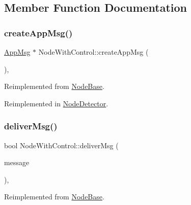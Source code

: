 \subsection{Member Function Documentation}
\mbox{\label{classNodeWithControl_a7772568c2836f5f204952ebe659e0049}} 
\subsubsection{\texorpdfstring{create\+App\+Msg()}{createAppMsg()}}
{\footnotesize\ttfamily \hyperlink{classAppMsg}{App\+Msg} $\ast$ Node\+With\+Control\+::create\+App\+Msg (\begin{DoxyParamCaption}{ }\end{DoxyParamCaption})\hspace{0.3cm}{\ttfamily [protected]}, {\ttfamily [virtual]}}



Reimplemented from \hyperlink{classNodeBase_ac8b9e21b1cc32fd86aaa6c956b93a7c3}{Node\+Base}.



Reimplemented in \hyperlink{classNodeDetector_a7100349647350ad5e3aeb1ed4669c723}{Node\+Detector}.

\mbox{\label{classNodeWithControl_aada7451be61be592b27188b6249afef2}} 
\subsubsection{\texorpdfstring{deliver\+Msg()}{deliverMsg()}}
{\footnotesize\ttfamily bool Node\+With\+Control\+::deliver\+Msg (\begin{DoxyParamCaption}\item[{const \hyperlink{structures_8h_a7e7bdc1d2fff8a9436f2f352b2711ed6}{message\+Info} \&}]{message }\end{DoxyParamCaption})\hspace{0.3cm}{\ttfamily [protected]}, {\ttfamily [virtual]}}



Reimplemented from \hyperlink{classNodeBase_a49052382add1123da26db6bfb687d254}{Node\+Base}.


